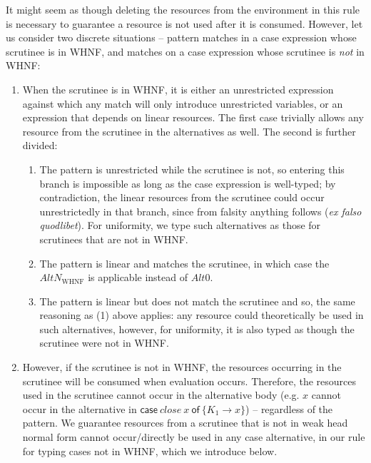 \documentclass[acmsmall,review]{acmart}
\newcommand{\ccase}[2]{\mathsf{case}~#1~\mathsf{of}~#2}
\begin{document}
It might seem as though deleting the resources from the environment in this
rule is necessary to guarantee a resource is not used after it is consumed.
%
However, let us consider two discrete situations -- pattern matches in a case
expression whose scrutinee is in WHNF, and matches on a case expression whose
scrutinee is \emph{not} in WHNF:
%
\begin{enumerate}
\item When the scrutinee is in WHNF, it is either an unrestricted expression
against which any match will only introduce unrestricted variables, or an
expression that depends on linear resources. The first case trivially allows
any resource from the scrutinee in the alternatives as well. The second is
further divided:
\begin{enumerate}

\item The pattern is unrestricted while the
scrutinee is not, so entering this branch is impossible as long as the case
expression is well-typed; by contradiction, the linear resources from the
scrutinee could occur unrestrictedly in that branch, since from falsity
anything follows (\emph{ex falso quodlibet}).
%
For uniformity, we type such alternatives as those for scrutinees that are not in WHNF.

\item The pattern is linear and matches the scrutinee, in which case the
$AltN_{\textrm{WHNF}}$ is applicable instead of $Alt0$.

\item The pattern is linear but does not match the scrutinee and so, the same
reasoning as (1) above applies: any resource could theoretically be used in
such alternatives, however, for uniformity, it is also typed as though the
scrutinee were not in WHNF.

\end{enumerate}

\item However, if the scrutinee is not in WHNF, the resources occurring in the
scrutinee will be consumed when evaluation occurs. Therefore, the resources
used in the scrutinee cannot occur in the alternative body
(e.g. $x$ cannot occur in the alternative in $\ccase{close~x}{\{K_1 \to x\}}$)
-- regardless of the pattern.
%
%
We guarantee resources from a scrutinee that is not in weak head normal form
cannot occur/directly be used in any case alternative, in our rule for typing
cases not in WHNF, which we introduce below.

\end{enumerate}
\end{document}
